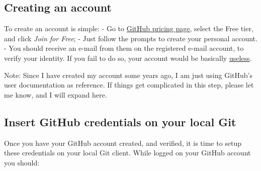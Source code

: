\documentclass[
]{book}
\begin{document}
\hypertarget{creating-an-account}{%
\subsection{Creating an account}\label{creating-an-account}}

To create an account is simple:
- Go to \href{https://github.com/pricing}{GitHub pricing page}, select the Free tier,
and click \emph{Join for Free};
- Just follow the prompts to create your personal account.
- You should receive an e-mail from them on the registered e-mail account, to verify your identity. If you fail to do so, your account would be basically \href{https://docs.github.com/en/get-started/signing-up-for-github/verifying-your-email-address\#about-email-verification}{useless}.

Note: Since I have created my account some years ago, I am just using GitHub's
user documentation as reference. If things get complicated in this step, please let me know, and I will expand here.

\hypertarget{insert-github-credentials-on-your-local-git}{%
\subsection{Insert GitHub credentials on your local Git}\label{insert-github-credentials-on-your-local-git}}

Once you have your GitHub account created, and verified, it is time to setup these
credentials on your local Git client. While logged on your GitHub account you should:
\end{document}
